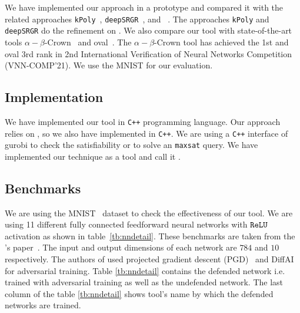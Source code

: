 We have implemented our approach in a prototype and compared it with the related 
approaches \texttt{kPoly}~\cite{singh2019beyond}, \texttt{deepSRGR}~\cite{yang2021improving}, and \deeppoly{}~\cite{singh2019abstract}. 
The approaches  \texttt{kPoly} and \texttt{deepSRGR} do the refinement on \deeppoly{}. We also compare 
our tool with state-of-the-art tools $\alpha - \beta$-Crown~\cite{alphabetacrown} and oval~\cite{ovaltool}. 
The $\alpha - \beta$-Crown tool has achieved the 1st and oval 3rd rank in
2nd International Verification of Neural Networks Competition (VNN-COMP'21). 
We use the MNIST \cite{deng2012mnist} for our evaluation.    
\subsection{Implementation}
We have implemented our tool in \texttt{C++} programming language. Our approach relies on \deeppoly{}, so 
we also have implemented \deeppoly{} in \texttt{C++}. We are using a \texttt{C++} interface of gurobi 
to check the satisfiability or to solve an \texttt{maxsat} query. We have implemented our technique as a tool and call it \drefine{}.  

\subsection{Benchmarks}
We are using the MNIST~\cite{deng2012mnist} dataset to check the effectiveness of our tool. 
We are using 11 different fully connected feedforward neural networks with $\texttt{ReLU}${} activation as shown in table~\ref{tb:nndetail}.
These benchmarks are taken from the \deeppoly{}'s paper~\cite{singh2019abstract}. 
The input and output dimensions of each network are $784$ and $10$ respectively. 
The authors of \deeppoly{} used projected gradient descent (PGD)~\cite{dong2018boosting}
and DiffAI~\cite{mirman2018differentiable} for adversarial training. Table \ref{tb:nndetail} contains the defended network i.e.
trained with adversarial training as well as the undefended network. The last column of the table \ref{tb:nndetail}
shows tool's name by which the defended networks are trained.  

